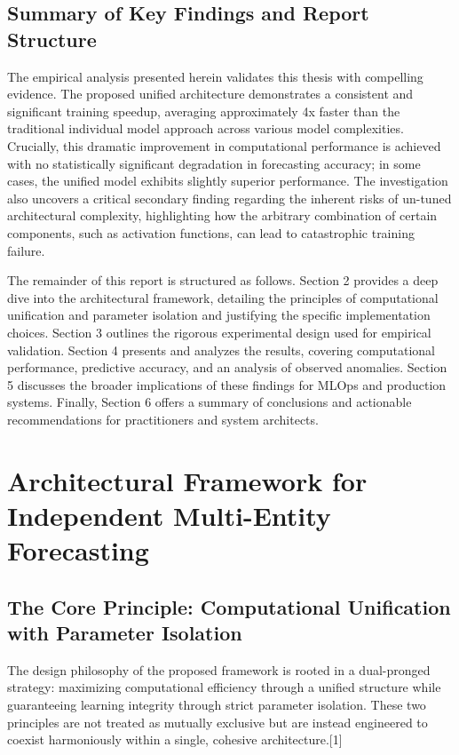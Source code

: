 \documentclass{article}
\begin{document}
\subsection{Summary of Key Findings and Report Structure}

The empirical analysis presented herein validates this thesis with compelling evidence. The proposed unified architecture demonstrates a consistent and significant training speedup, averaging approximately 4x faster than the traditional individual model approach across various model complexities. Crucially, this dramatic improvement in computational performance is achieved with no statistically significant degradation in forecasting accuracy; in some cases, the unified model exhibits slightly superior performance. The investigation also uncovers a critical secondary finding regarding the inherent risks of un-tuned architectural complexity, highlighting how the arbitrary combination of certain components, such as activation functions, can lead to catastrophic training failure.

The remainder of this report is structured as follows. Section 2 provides a deep dive into the architectural framework, detailing the principles of computational unification and parameter isolation and justifying the specific implementation choices. Section 3 outlines the rigorous experimental design used for empirical validation. Section 4 presents and analyzes the results, covering computational performance, predictive accuracy, and an analysis of observed anomalies. Section 5 discusses the broader implications of these findings for MLOps and production systems. Finally, Section 6 offers a summary of conclusions and actionable recommendations for practitioners and system architects.

\section{Architectural Framework for Independent Multi-Entity Forecasting}

\subsection{The Core Principle: Computational Unification with Parameter Isolation}

The design philosophy of the proposed framework is rooted in a dual-pronged strategy: maximizing computational efficiency through a unified structure while guaranteeing learning integrity through strict parameter isolation. These two principles are not treated as mutually exclusive but are instead engineered to coexist harmoniously within a single, cohesive architecture.[1]
\end{document}
